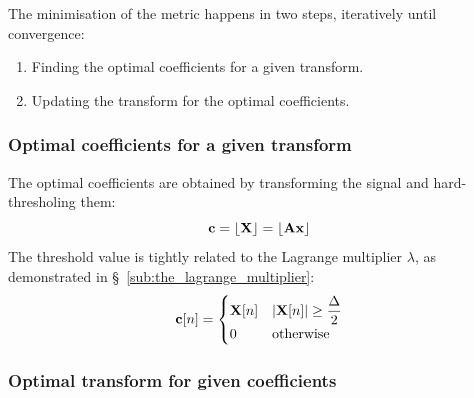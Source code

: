 \documentclass[11pt,a4paper,openright,twoside]{book}
\numberwithin{equation}{section} %
\begin{document}
The minimisation of the metric happens in two steps, iteratively until
convergence:
\begin{enumerate}
	\item Finding the optimal coefficients for a given transform.
	\item Updating the transform for the optimal coefficients.
\end{enumerate}

\subsubsection{Optimal coefficients for a given transform}
\label{ssub:optimal_coefficients_for_a_given_transform}

The optimal coefficients are obtained by transforming the signal and
hard-thresholing them:
\begin{equation}
	\mathbf{c} = \lfloor \mathbf{X} \rfloor = \lfloor \mathbf{A} \mathbf{x} \rfloor
\end{equation}
The threshold value is tightly related to the Lagrange multiplier $\lambda$,
as demonstrated in \S~\ref{sub:the_lagrange_multiplier}:
\begin{equation}
	\mathbf{c}[n] =
	\begin{cases}
		\mathbf{X}[n] & \vert \mathbf{X}[n] \vert \ge \displaystyle \frac{\Delta}{2} \\
		0     & \text{otherwise} \\
	\end{cases}
	\label{eqn:hard_threshold}
\end{equation}

\subsubsection{Optimal transform for given coefficients}
\label{ssub:optimal_transform_for_given_coefficients}
\end{document}
